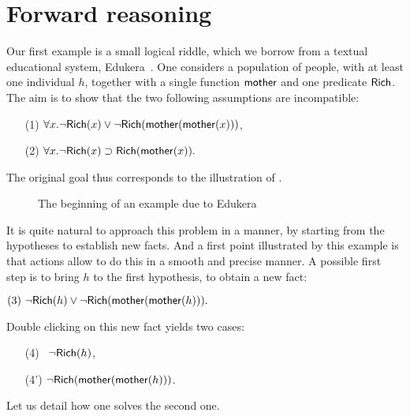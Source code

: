
\section{Forward reasoning}


Our first example is a small logical riddle, which we borrow from a textual
educational system, Edukera~. One considers a population of
people, with at least one individual $h$, together with a single function
$\mbox{\textsf{mother}}$ and one predicate $\mbox{\textsf{Rich}}$. The aim is to show that the two following
assumptions are incompatible:
\begin{itemize}
\item[(1)] $\forall x. \neg\mbox{\textsf{Rich}}(x)\lor \neg\mbox{\textsf{Rich}}(\mbox{\textsf{mother}}(\mbox{\textsf{mother}}(x)))$,
\item[(2)] $\forall x. \neg\mbox{\textsf{Rich}}(x) \supset \mbox{\textsf{Rich}}(\mbox{\textsf{mother}}(x)).$
\end{itemize}
The original goal thus corresponds to the illustration of .

\begin{figure*}
  \caption{The beginning of an example due to Edukera}
\end{figure*}

It is quite natural to approach this problem in a  manner, by starting
from the hypotheses to establish new facts. And a first point illustrated by
this example is that  actions allow to do this in a smooth and precise
manner. A possible first step is to bring $h$ to the first hypothesis, to obtain
a new fact:

\medskip
$(3) ~\neg\mbox{\textsf{Rich}}(h)\lor \neg\mbox{\textsf{Rich}}(\mbox{\textsf{mother}}(\mbox{\textsf{mother}}(h))).$
\medskip

\noindent Double clicking on this new fact yields two cases:
\begin{itemize}
 \item[(4)~] $ \neg\mbox{\textsf{Rich}}(h)$,
 \item[(4')] $ \neg\mbox{\textsf{Rich}}(\mbox{\textsf{mother}}(\mbox{\textsf{mother}}(h)))$.
 \end{itemize}
Let us detail how one solves the
second one.

